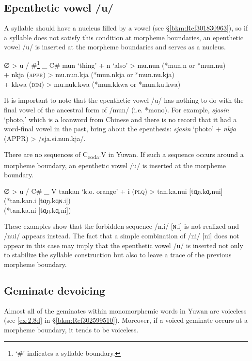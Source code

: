 \subsection{Epenthetic vowel /u/}
\label{bkm:Ref301838720}\hypertarget{RefHeadingToc395696980}{}\label{bkm:Ref347173344}
A syllable should have a nucleus filled by a vowel (see §\ref{bkm:Ref301830963}), so if a syllable does not satisfy this condition at morpheme boundaries, an epenthetic vowel /u/ is inserted at the morpheme boundaries and serves as a nucleus.

\ea  ∅   >   u   /   \#\footnote{‘\#’ indicates a syllable boundary.}   \_   C\#
\ex
\ea  mun   ‘thing’   +   n   ‘also’   >   mu.nun   (*mun.n or *mun.nu)\\
\ex  +   nkja   (\textsc{appr})   >   mu.nun.kja   (*mun.nkja or *mun.nu.kja)\\
\ex  +   kkwa   (\textsc{dim})   >   mu.nuk.kwa   (*mun.kkwa or *mun.ku.kwa)\\
\z
\z

It is important to note that the epenthetic vowel /u/ has nothing to do with the final vowel of the ancestral form of /mun/ (i.e. *mono). For example, \textit{sjasin} ‘photo,’ which is a loanword from Chinese and there is no record that it had a word-final vowel in the past, bring about the epenthesis: \textit{sjasin} ‘photo’ + \textit{nkja} (APPR) > /sja.si.nun.kja/.

There are no sequences of C\textsubscript{coda}.V in Yuwan. If such a sequence occurs around a morpheme boundary, an epenthetic vowel /u/ is inserted at the morpheme boundary.

\ea   ∅   >   u   /   C\#   \_   V
\ex  \gll tankan   ‘k.o. orange’   +   i   (\textsc{plq})   >   tan.ka.nui [tɑ̟ŋ.kɑ̟.nui]   (*tan.kan.i [tɑ̟ŋ.kɑ̟ɴ.i])\\
           {}         {}           {}  {}  {}      {}    {}          {}          (*tan.ka.ni [tɑ̟ŋ.kɑ̟.ni])\\
\z

These examples show that the forbidden sequence /n.i/ [ɴ.i] is not realized and /nui/ appears instead. The fact that a simple combination of /ni/ [ni] does not appear in this case may imply that the epenthetic vowel /u/ is inserted not only to stabilize the syllable construction but also to leave a trace of the previous morpheme boundary.

\subsection{Geminate devoicing}
\label{bkm:Ref347178914}\hypertarget{RefHeadingToc395696981}{}
Almost all of the geminates within monomorphemic words in Yuwan are voiceless (see \ref{ex:2.8d} in §\ref{bkm:Ref302599510}). Moreover, if a voiced geminate occurs at a morpheme boundary, it tends to be voiceless.

